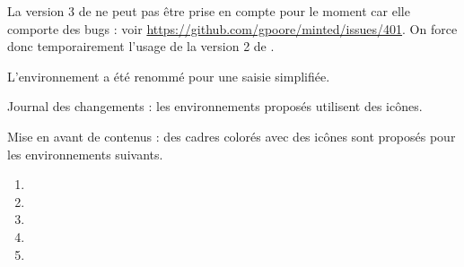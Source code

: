 \documentclass[12pt, a4paper]{article}
\begin{document}
\begin{tdoctech}
    \item La version 3 de  ne peut pas être prise en compte pour le moment car elle comporte des bugs : voir \url{https://github.com/gpoore/minted/issues/401}. On force donc temporairement l'usage de la version 2 de .
\end{tdoctech}


\begin{tdocbreak}
    \item L'environnement  a été renommé  pour une saisie simplifiée.
\end{tdocbreak}


\begin{tdocnew}
    \item Journal des changements : les environnements proposés utilisent des icônes.


    \item Mise en avant de contenus : des cadres colorés avec des icônes sont proposés pour les environnements suivants.
    \bgroup
    \setlength\multicolsep{5pt}
    \begin{multicols}{3}
        \begin{enumerate}
            \item {}
            \item {}
            \item {}
            \item {}
            \item {}
        \end{enumerate}
    \end{multicols}
    \egroup
\end{tdocnew}
\end{document}
